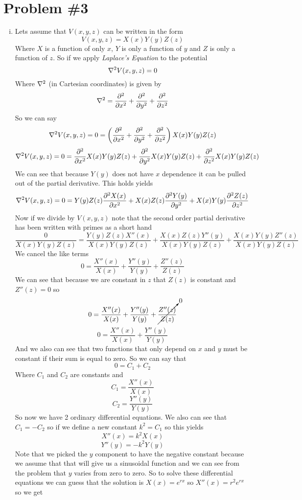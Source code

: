\documentclass[11pt]{article}
\numberwithin{equation}{section}
\newcommand{\grad}{\bold\nabla}
\begin{document}
\section{Problem \#3}
\begin{enumerate}[(i)]
\item
Lets assume that $V(x,y,z)$ can be written in the form
$$V(x,y,z) = X(x)Y(y)Z(z)$$
Where $X$ is a function of only $x$, $Y$ is only a function of $y$ and $Z$ is only a function of $z$. So if we apply \emph{Laplace's Equation} to the potential
\begin{equation}
\grad^2V(x,y,z)=0
\label{lapace}
\end{equation}
Where $\grad^2$ (in Cartesian coordinates) is given  by
$$\grad^2 = \frac{\partial^2}{\partial x^2}+\frac{\partial^2}{\partial y^2}+\frac{\partial^2}{\partial z^2}$$
So we can say
$$\grad^2V(x,y,z) =0= \left(\frac{\partial^2}{\partial x^2}+\frac{\partial^2}{\partial y^2}+\frac{\partial^2}{\partial z^2}\right)X(x)Y(y)Z(z)$$
$$\grad^2V(x,y,z) =0= \frac{\partial^2}{\partial x^2}X(x)Y(y)Z(z)+\frac{\partial^2}{\partial y^2}X(x)Y(y)Z(z)+\frac{\partial^2}{\partial z^2}X(x)Y(y)Z(z)$$
We can see that because $Y(y)$ does not have $x$ dependence it can be pulled out of the partial derivative. This holds yields
$$\grad^2V(x,y,z) =0= Y(y)Z(z)\frac{\partial^2X(x)}{\partial x^2}+X(x)Z(z)\frac{\partial^2Y(y)}{\partial y^2}+X(x)Y(y)\frac{\partial^2Z(z)}{\partial z^2}$$
Now if we divide by $V(x,y,z)$ note that the second order partial derivative has been written with primes as a short hand
$$\frac{0}{X(x)Y(y)Z(z)}= \frac{Y(y)Z(z)X''(x)}{X(x)Y(y)Z(z)}+\frac{X(x)Z(z)Y''(y)}{X(x)Y(y)Z(z)}+\frac{X(x)Y(y)Z''(z)}{X(x)Y(y)Z(z)}$$
We cancel the like terms
$$0= \frac{X''(x)}{X(x)}+\frac{Y''(y)}{Y(y)}+\frac{Z''(z)}{Z(z)}$$
We can see that because we are constant in $z$ that $Z(z)$ is constant and $Z''(z)=0$ so
$$0= \frac{X''(x)}{X(x)}+\frac{Y''(y)}{Y(y)}+\cancelto{0}{\frac{Z''(z)}{Z(z)}}$$
$$0= \frac{X''(x)}{X(x)}+\frac{Y''(y)}{Y(y)}$$
And we also can see that two functions that only depend on $x$ and $y$ must be constant if their sum is equal to zero. So we can say that
$$0= C_1+C_2$$
Where $C_1$ and $C_2$ are constants and
$$C_1 = \frac{X''(x)}{X(x)}$$
$$C_2 = \frac{Y''(y)}{Y(y)}$$
So now we have 2 ordinary differential equations. We also can see that $C_1=-C_2$ so if we define a new constant $k^2=C_1$ so this yields
$$X''(x)= k^2X(x)$$
$$Y''(y)= -k^2Y(y)$$
Note that we picked the $y$ component to have the negative constant because we assume that that will give us a sinusoidal function and we can see from the problem that $y$ varies from zero to zero. So to solve these differential equations we can guess that the solution is $X(x)=e^{rx}$ so $X''(x)=r^2e^{rx}$ so we get

\end{enumerate}
\end{document}
